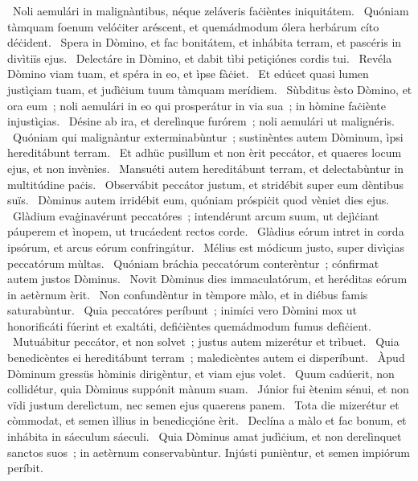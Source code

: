 ~Noli aemulári in malignàntibus, néque zeláveris faċièntes iniquitátem. 
~Quóniam tàmquam foenum velóċiter aréscent, et quemádmodum ólera herbárum cíto déċident. 
~Spera in Dòmino, et fac bonitátem, et inhábita terram, et pascéris in divìtiïs ejus. 
~Delectáre in Dòmino, et dabit tìbi petiçiónes cordis tui. 
~Revéla Dòmino viam tuam, et spéra in eo, et ìpse fàċiet. 
~Et edúcet quasi lumen justìçiam tuam, et judìċium tuum tàmquam merídiem. 
~Sùbditus èsto Dòmino, et ora eum~; noli aemulári in eo qui prosperátur in via sua~; in hòmine faċiènte injustìçias. 
~Désine ab ira, et derelìnque furórem~; noli aemulári ut malignéris. 
~Quóniam qui malignàntur exterminabùntur~; sustinèntes autem Dòminum, ìpsi hereditábunt terram. 
~Et adhüc pusìllum et non èrit peccátor, et quaeres locum ejus, et non invènies. 
~Mansuéti autem hereditábunt terram, et delectabùntur in multitúdine paċis. 
~Observábit peccátor justum, et stridébit super eum dèntibus suïs. 
~Dòminus autem irridébit eum, quóniam próspiċit quod vèniet dies ejus. 
~Glàdium evaġinavérunt peccatóres~; intendérunt arcum suum, ut dejìċiant páuperem et ìnopem, ut trucáedent rectos corde. 
~Glàdius eórum intret in corda ipsórum, et arcus eórum confringátur. 
~Mélius est módicum justo, super divìçias peccatórum mùltas. 
~Quóniam bráchia peccatórum conterèntur~; cónfirmat autem justos Dòminus. 
~Novit Dòminus dies immaculatórum, et heréditas eórum in aetèrnum èrit. 
~Non confundèntur in tèmpore màlo, et in diébus famis saturabùntur. 
~Quia peccatóres períbunt~; inimíci vero Dòmini mox ut honorificáti fúerint et exaltáti, defiċièntes quemádmodum fumus defìċient. 
~Mutuábitur peccátor, et non solvet~; justus autem mizerétur et trìbuet. 
~Quia benedicèntes ei hereditábunt terram~; maledicèntes autem ei disperíbunt. 
~Àpud Dòminum gressüs hòminis dirigèntur, et viam ejus volet. 
~Quum cadúerit, non collidétur, quia Dòminus suppónit mànum suam. 
~Júnior fui ètenim sénui, et non vïdi justum derelìctum, nec semen ejus quaerens panem. 
~Tota die mizerétur et còmmodat, et semen ìllius in benedicçióne èrit. 
~Declína a màlo et fac bonum, et inhábita in sáeculum sáeculi. 
~Quia Dòminus amat judìċium, et non derelìnquet sanctos suos~; in aetèrnum conservabùntur. Injústi punièntur, et semen impiórum períbit. 
